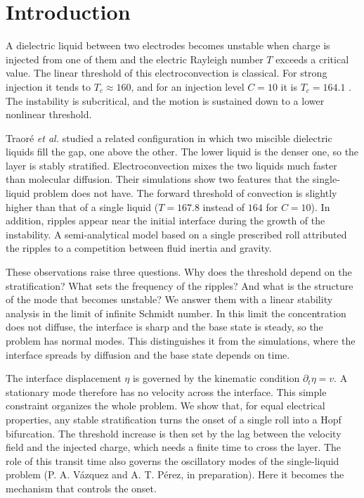 \documentclass[aip,pof,reprint,amsmath,amssymb]{revtex4-2}
\begin{document}
\section{Introduction}

A dielectric liquid between two electrodes becomes unstable when charge is injected from
one of them and the electric Rayleigh number $T$ exceeds a critical value. The linear
threshold of this electroconvection is classical. For strong injection it tends to
$T_c\approx 160$, and for an injection level $C=10$ it is $T_c=164.1$
\cite{AttenMoreau1972,Lacroix1975,Castellanos1998,Perez2014}. The instability is
subcritical, and the motion is sustained down to a lower nonlinear threshold.

Traor\'e \emph{et al.} \cite{Traore2024} studied a related configuration in which two
miscible dielectric liquids fill the gap, one above the other. The lower liquid is the
denser one, so the layer is stably stratified. Electroconvection mixes the two liquids
much faster than molecular diffusion. Their simulations show two features that the
single-liquid problem does not have. The forward threshold of convection is slightly
higher than that of a single liquid ($T=167.8$ instead of $164$ for $C=10$). In addition,
ripples appear near the initial interface during the growth of the instability. A
semi-analytical model based on a single prescribed roll attributed the ripples to a
competition between fluid inertia and gravity.

These observations raise three questions. Why does the threshold depend on the
stratification? What sets the frequency of the ripples? And what is the structure of the
mode that becomes unstable? We answer them with a linear stability analysis in the limit of
infinite Schmidt number. In this limit the concentration does not diffuse, the interface
is sharp and the base state is steady, so the problem has normal modes. This distinguishes
it from the simulations, where the interface spreads by diffusion and the base state
depends on time.

The interface displacement $\eta$ is governed by the kinematic condition
$\partial_t\eta=v$. A stationary mode therefore has no velocity across the interface. This
simple constraint organizes the whole problem. We show that, for equal electrical
properties, any stable stratification turns the onset of a single roll into a Hopf
bifurcation. The threshold increase is then set by the lag between the velocity field and
the injected charge, which needs a finite time to cross the layer. The role of this
transit time also governs the oscillatory modes of the single-liquid problem
(P. A. V\'azquez and A. T. P\'erez, in preparation). Here it becomes the mechanism that
controls the onset.
\end{document}
